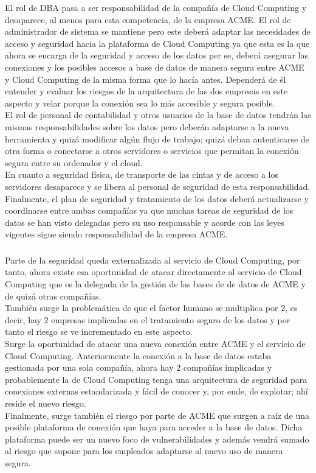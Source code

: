 \documentclass[10pt,a4paper]{article}
\begin{document}
El rol de DBA pasa a ser responsabilidad de la compañía de Cloud Computing y desaparece, al menos para esta competencia, de la empresa ACME. El rol de administrador de sistema se mantiene pero este deberá adaptar las necesidades de acceso y seguridad hacia la plataforma de Cloud Computing ya que esta es la que ahora se encarga de la seguridad y acceso de los datos per se, deberá asegurar las conexiones y los posibles accesos a base de datos de manera segura entre ACME y Cloud Computing de la misma forma que lo hacía antes. Dependerá de él entender y evaluar los riesgos de la arquitectura de las dos empresas en este aspecto y velar porque la conexión sea lo más accesible y segura posible.\\
El rol de personal de contabilidad y otros usuarios de la base de datos tendrán las mismas responsabilidades sobre los datos pero deberán adaptarse a la nueva herramienta y quizá modificar algún flujo de trabajo; quizá deban autenticarse de otra forma o conectarse a otros servidores o servicios que permitan la conexión segura entre su ordenador y el cloud.\\
En cuanto a seguridad física, de transporte de las cintas y de acceso a los servidores desaparece y se libera al personal de seguridad de esta responsabilidad.\\Finalmente, el plan de seguridad y tratamiento de los datos deberá actualizarse y coordinarse entre ambas compañías ya que muchas tareas de seguridad de los datos se han visto delegadas pero su uso responsable y acorde con las leyes vigentes sigue siendo responsabilidad de la empresa ACME.

\subsubsection{}
Parte de la seguridad queda externalizada al servicio de Cloud Computing, por tanto, ahora existe esa oportunidad de atacar directamente al servicio de Cloud Computing que es la delegada de la gestión de las bases de de datos de ACME y de quizá otras compañías.\\
También surge la problemática de que el factor humano se multiplica por 2, es decir, hay 2 empresas implicadas en el tratamiento seguro de los datos y por tanto el riesgo se ve incrementado en este aspecto.\\
Surge la oportunidad de atacar una nueva conexión entre ACME y el servicio de Cloud Computing. Anteriormente la conexión a la base de datos estaba gestionada por una sola compañía, ahora hay 2 compañías implicadas y probablemente la de Cloud Computing tenga una arquitectura de seguridad para conexiones externas estandarizada y fácil de conocer y, por ende, de explotar; ahí reside el nuevo riesgo.\\
Finalmente, surge también el riesgo por parte de ACME que surgen a raíz de una posible plataforma de conexión que haya para acceder a la base de datos. Dicha plataforma puede ser un nuevo foco de vulnerabilidades y además vendrá sumado al riesgo que supone para los empleados adaptarse al nuevo uso de manera segura.
\end{document}
